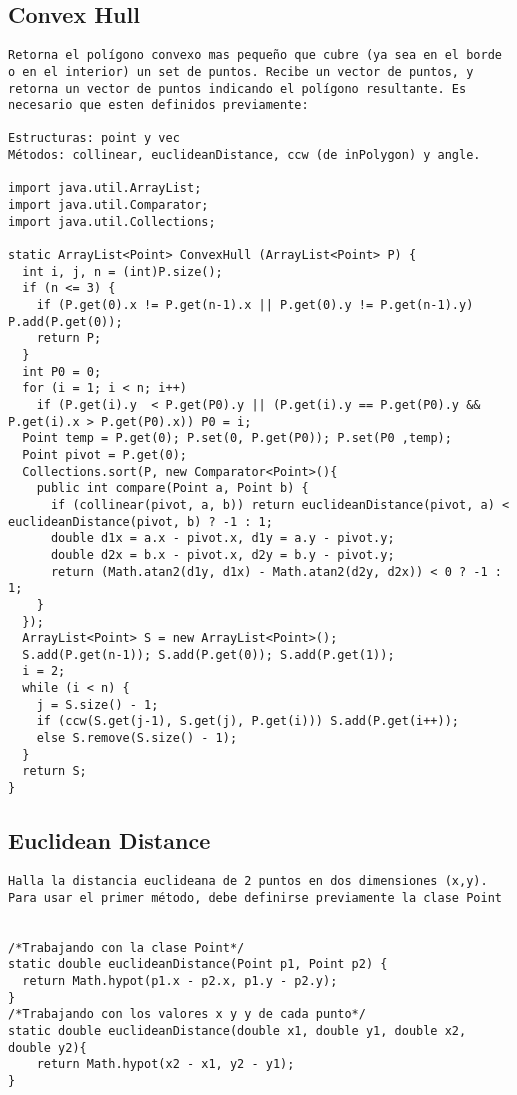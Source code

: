 \documentclass[10pt,letterpaper,twocolumn,twosided]{article}
\begin{document}
\subsection{Convex Hull}
\begin{lstlisting}
Retorna el polígono convexo mas pequeño que cubre (ya sea en el borde o en el interior) un set de puntos. Recibe un vector de puntos, y retorna un vector de puntos indicando el polígono resultante. Es necesario que esten definidos previamente: 

Estructuras: point y vec
Métodos: collinear, euclideanDistance, ccw (de inPolygon) y angle.

import java.util.ArrayList;
import java.util.Comparator;
import java.util.Collections;

static ArrayList<Point> ConvexHull (ArrayList<Point> P) {
  int i, j, n = (int)P.size();
  if (n <= 3) {
    if (P.get(0).x != P.get(n-1).x || P.get(0).y != P.get(n-1).y) P.add(P.get(0)); 
    return P;
  }
  int P0 = 0;
  for (i = 1; i < n; i++)
    if (P.get(i).y  < P.get(P0).y || (P.get(i).y == P.get(P0).y && P.get(i).x > P.get(P0).x)) P0 = i;
  Point temp = P.get(0); P.set(0, P.get(P0)); P.set(P0 ,temp); 
  Point pivot = P.get(0);
  Collections.sort(P, new Comparator<Point>(){
    public int compare(Point a, Point b) { 
      if (collinear(pivot, a, b)) return euclideanDistance(pivot, a) < euclideanDistance(pivot, b) ? -1 : 1;
      double d1x = a.x - pivot.x, d1y = a.y - pivot.y;
      double d2x = b.x - pivot.x, d2y = b.y - pivot.y;
      return (Math.atan2(d1y, d1x) - Math.atan2(d2y, d2x)) < 0 ? -1 : 1;
    }
  });
  ArrayList<Point> S = new ArrayList<Point>();
  S.add(P.get(n-1)); S.add(P.get(0)); S.add(P.get(1));
  i = 2; 
  while (i < n) { 
    j = S.size() - 1;
    if (ccw(S.get(j-1), S.get(j), P.get(i))) S.add(P.get(i++)); 
    else S.remove(S.size() - 1); 
  }
  return S;
}\end{lstlisting}

\subsection{Euclidean Distance}
\begin{lstlisting}
Halla la distancia euclideana de 2 puntos en dos dimensiones (x,y). Para usar el primer método, debe definirse previamente la clase Point

    
/*Trabajando con la clase Point*/
static double euclideanDistance(Point p1, Point p2) {           
  return Math.hypot(p1.x - p2.x, p1.y - p2.y); 
} 
/*Trabajando con los valores x y y de cada punto*/
static double euclideanDistance(double x1, double y1, double x2, double y2){ 
    return Math.hypot(x2 - x1, y2 - y1);         
} 


\end{lstlisting}
\end{document}
